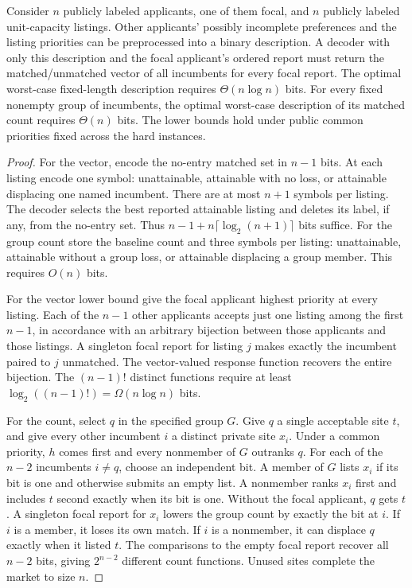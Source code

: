 \begin{theorem}\label{thm:status-bits}
Consider $n$ publicly labeled applicants, one of them focal, and $n$ publicly labeled unit-capacity listings. Other applicants' possibly incomplete preferences and the listing priorities can be preprocessed into a binary description. A decoder with only this description and the focal applicant's ordered report must return the matched/unmatched vector of all incumbents for every focal report. The optimal worst-case fixed-length description requires $\Theta(n\log n)$ bits. For every fixed nonempty group of incumbents, the optimal worst-case description of its matched count requires $\Theta(n)$ bits. The lower bounds hold under public common priorities fixed across the hard instances.
\end{theorem}
\begin{proof}
For the vector, encode the no-entry matched set in $n-1$ bits. At each listing encode one symbol: unattainable, attainable with no loss, or attainable displacing one named incumbent. There are at most $n+1$ symbols per listing. The decoder selects the best reported attainable listing and deletes its label, if any, from the no-entry set. Thus $n-1+n\lceil\log_2(n+1)\rceil$ bits suffice. For the group count store the baseline count and three symbols per listing: unattainable, attainable without a group loss, or attainable displacing a group member. This requires $O(n)$ bits.

For the vector lower bound give the focal applicant highest priority at every listing. Each of the $n-1$ other applicants accepts just one listing among the first $n-1$, in accordance with an arbitrary bijection between those applicants and those listings. A singleton focal report for listing $j$ makes exactly the incumbent paired to $j$ unmatched. The vector-valued response function recovers the entire bijection. The $(n-1)!$ distinct functions require at least $\log_2((n-1)!)=\Omega(n\log n)$ bits.

For the count, select $q$ in the specified group $G$. Give $q$ a single acceptable site $t$, and give every other incumbent $i$ a distinct private site $x_i$. Under a common priority, $h$ comes first and every nonmember of $G$ outranks $q$. For each of the $n-2$ incumbents $i\ne q$, choose an independent bit. A member of $G$ lists $x_i$ if its bit is one and otherwise submits an empty list. A nonmember ranks $x_i$ first and includes $t$ second exactly when its bit is one. Without the focal applicant, $q$ gets $t$. A singleton focal report for $x_i$ lowers the group count by exactly the bit at $i$. If $i$ is a member, it loses its own match. If $i$ is a nonmember, it can displace $q$ exactly when it listed $t$. The comparisons to the empty focal report recover all $n-2$ bits, giving $2^{n-2}$ different count functions. Unused sites complete the market to size $n$.
\end{proof}

